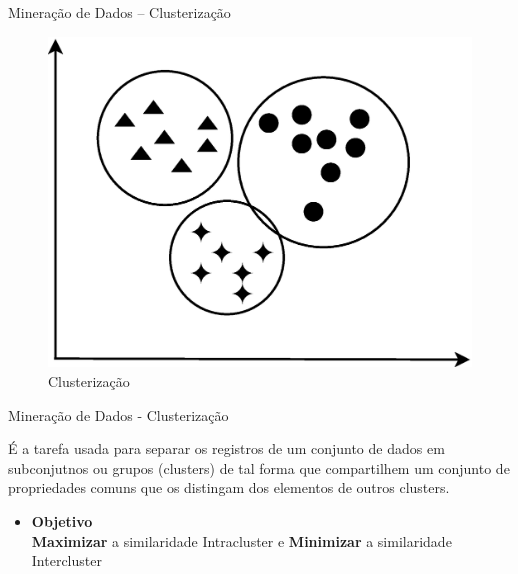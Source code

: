 \documentclass[hyperref={pdfpagelabels=false}]{beamer}
\begin{document}
\begin{frame}

    
    \Large{Mineração de Dados -- Clusterização}
    
    \begin{figure}
		\centering
	    \includegraphics[scale=0.3]{img/Clustering.eps}
        \caption{\scriptsize{Clusterização}}
	\end{figure}
    

\end{frame}

\begin{frame}

    
    \Large{Mineração de Dados - Clusterização}\linebreak
    \normalsize
   
    É a tarefa usada para separar os registros de um conjunto de dados em subconjutnos ou grupos (clusters) de tal forma que compartilhem um conjunto de propriedades comuns que os distingam dos elementos de outros clusters. \cite{goldschmidt2015data}
    \begin{itemize}
    \item \large{\textbf{Objetivo}} \\
    	\normalsize\textbf{Maximizar} a similaridade Intracluster e \textbf{Minimizar} a similaridade Intercluster
  		
    \end{itemize}
    

\end{frame}
\end{document}

